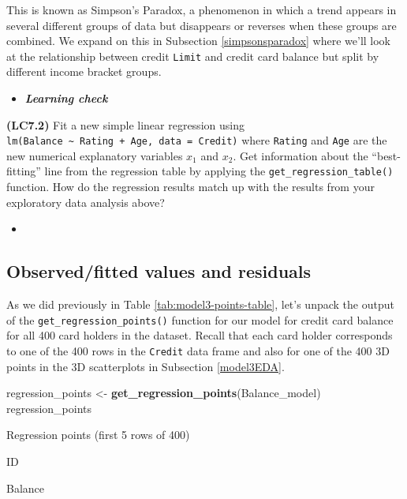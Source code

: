 \documentclass[12pt,]{krantz}
\makeatletter
\newenvironment{Shaded}{\begin{snugshade}}{\end{snugshade}}
\newcommand{\KeywordTok}[1]{\textcolor[rgb]{0.27,0.27,0.27}{\textbf{#1}}}
\newcommand{\StringTok}[1]{\textcolor[rgb]{0.5,0.5,0.5}{#1}}
\newcommand{\NormalTok}[1]{#1}
\newenvironment{kframe}{%
\medskip{}
\setlength{\fboxsep}{.8em}
 \def\at@end@of@kframe{}%
 \ifinner\ifhmode%
  \def\at@end@of@kframe{\end{minipage}}%
  \begin{minipage}{\columnwidth}%
 \fi\fi%
 \def\FrameCommand##1{\hskip\@totalleftmargin \hskip-\fboxsep
 \colorbox{shadecolor}{##1}\hskip-\fboxsep
     \hskip-\linewidth \hskip-\@totalleftmargin \hskip\columnwidth}%
 \MakeFramed {\advance\hsize-\width
   \@totalleftmargin\z@ \linewidth\hsize
   \@setminipage}}%
 {\par\unskip\endMakeFramed%
 \at@end@of@kframe}
\renewenvironment{Shaded}{\begin{kframe}}{\end{kframe}}
\newenvironment{rmdblock}[1]
  {\begin{shaded*}
  \begin{itemize}
  \renewcommand{\labelitemi}{
    \raisebox{-.7\height}[0pt][0pt]{
    }
  }
  \item
  }
  {
  \end{itemize}
  \end{shaded*}
  }
\newenvironment{learncheck}
  {\begin{rmdblock}{warning}}
  {\end{rmdblock}}
\makeatother
\begin{document}
This is known as Simpson's Paradox, a phenomenon in which a trend
appears in several different groups of data but disappears or reverses
when these groups are combined. We expand on this in Subsection
\ref{simpsonsparadox} where we'll look at the relationship between
credit \texttt{Limit} and credit card balance but split by different
income bracket groups.

\begin{learncheck}
\textbf{\emph{Learning check}}
\end{learncheck}

\textbf{(LC7.2)} Fit a new simple linear regression using
\texttt{lm(Balance\ \textasciitilde{}\ Rating\ +\ Age,\ data\ =\ Credit)}
where \texttt{Rating} and \texttt{Age} are the new numerical explanatory
variables \(x_1\) and \(x_2\). Get information about the
``best-fitting'' line from the regression table by applying the
\texttt{get\_regression\_table()} function. How do the regression
results match up with the results from your exploratory data analysis
above?

\begin{learncheck}

\end{learncheck}

\subsection{Observed/fitted values and residuals}\label{model3points}

As we did previously in Table \ref{tab:model3-points-table}, let's
unpack the output of the \texttt{get\_regression\_points()} function for
our model for credit card balance for all 400 card holders in the
dataset. Recall that each card holder corresponds to one of the 400 rows
in the \texttt{Credit} data frame and also for one of the 400 3D points
in the 3D scatterplots in Subsection \ref{model3EDA}.

\begin{Shaded}
\begin{Highlighting}[]
\NormalTok{regression_points <-}\StringTok{ }\KeywordTok{get_regression_points}\NormalTok{(Balance_model)}
\NormalTok{regression_points}
\end{Highlighting}
\end{Shaded}

\label{tab:model3-points-table}Regression points (first 5 rows of 400)

ID

Balance
\end{document}
